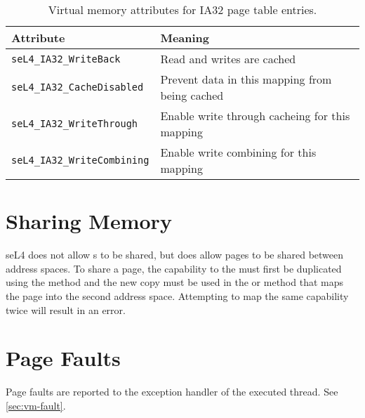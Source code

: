 \begin{table}[htb]
  \begin{center}
    \begin{tabularx}{\textwidth}{p{}X}
      \toprule
      Attribute & Meaning \\
      \midrule
      \texttt{seL4\_IA32\_WriteBack} & Read and writes are cached \\
      \texttt{seL4\_IA32\_CacheDisabled} & Prevent data in this mapping
      from being cached \\
      \texttt{seL4\_IA32\_WriteThrough} & Enable write through cacheing for this mapping \\
      \texttt{seL4\_IA32\_WriteCombining} & Enable write combining for this mapping \\
      \bottomrule
    \end{tabularx}
    \caption{\label{tbl:vmattr_ia32} Virtual memory attributes for IA32 page
      table entries.}
  \end{center}
\end{table}

\section{Sharing Memory}

seL4 does not allow s to be shared, but does allow
pages to be shared between address spaces. 
To share a page, the capability to the 
 must first be
duplicated using the  method and the new copy must
be used in the  \ifxeightsix or  \fi method that maps the page into the second
address space. Attempting to map the same capability
twice will result in an error. 


\section{Page Faults}

Page faults are reported to the exception handler of the executed thread.
See \autoref{sec:vm-fault}.
